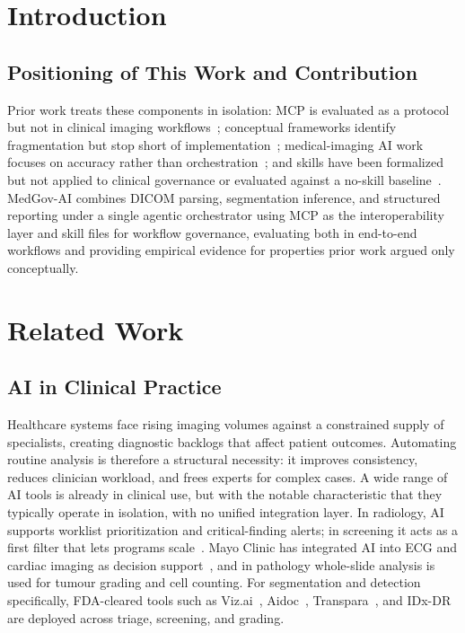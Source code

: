 \documentclass[preprint,12pt]{elsarticle}
\begin{document}
\section{Introduction}
\label{sec:introduction}

\subsection{Positioning of This Work and Contribution}
Prior work treats these components in isolation: MCP is evaluated as a protocol but not in clinical imaging workflows~\cite{mcp-aditi, mcphosts2025}; conceptual frameworks identify fragmentation but stop short of implementation~\cite{transformingclinical2026}; medical-imaging AI work focuses on accuracy rather than orchestration~\cite{agiformedicalimaging2025}; and skills have been formalized but not applied to clinical governance or evaluated against a no-skill baseline~\cite{agentskillslargelanguage}. MedGov-AI combines DICOM parsing, segmentation inference, and structured reporting under a single agentic orchestrator using MCP as the interoperability layer and skill files for workflow governance, evaluating both in end-to-end workflows and providing empirical evidence for properties prior work argued only conceptually.

\section{Related Work}
\label{sec:relatedwork}

\subsection{AI in Clinical Practice}
Healthcare systems face rising imaging volumes against a constrained supply of specialists, creating diagnostic backlogs that affect patient outcomes. Automating routine analysis is therefore a structural necessity: it improves consistency, reduces clinician workload, and frees experts for complex cases. A wide range of AI tools is already in clinical use, but with the notable characteristic that they typically operate in isolation, with no unified integration layer. In radiology, AI supports worklist prioritization and critical-finding alerts; in screening it acts as a first filter that lets programs scale~\cite{ruamviboonsuk2022retinopathy, wolf2024access}. Mayo Clinic has integrated AI into ECG and cardiac imaging as decision support~\cite{mayoclinic-ai-cardiology}, and in pathology whole-slide analysis is used for tumour grading and cell counting. For segmentation and detection specifically, FDA-cleared tools such as Viz.ai~\cite{vizai}, Aidoc~\cite{aidoc}, Transpara~\cite{transpara}, and IDx-DR~\cite{idxdr} are deployed across triage, screening, and grading.
\end{document}
